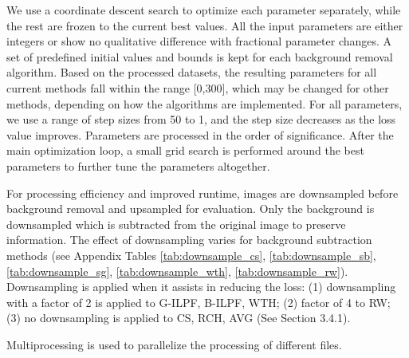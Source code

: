 \documentclass[iucr,review]{iucrjournals}
\begin{document}

We use a coordinate descent search to optimize each parameter separately, while the rest are frozen to the current best values. 
All the input parameters are either integers or show no qualitative difference with fractional parameter changes. 
A set of predefined initial values and bounds is kept for each background removal algorithm.
Based on the processed datasets, the resulting parameters for all current methods fall within the range [0,300],
which may be changed for other methods, depending on how the algorithms are implemented.
For all parameters, we use a range of step sizes from 50 to 1, and the step size decreases as the loss value improves. 
Parameters are processed in the order of significance. After the main optimization loop,
a small grid search is performed around the best parameters to further tune the parameters altogether.

For processing efficiency and improved runtime, images are downsampled before background removal
and upsampled for evaluation. Only the background is downsampled which is subtracted from the original image
to preserve information. The effect of downsampling varies for background subtraction methods
(see Appendix Tables \ref{tab:downsample_cs}, \ref{tab:downsample_sb}, \ref{tab:downsample_sg}, \ref{tab:downsample_wth}, \ref{tab:downsample_rw}).
Downsampling is applied when it assists in reducing the loss: (1)
downsampling with
a factor of 2 is applied to G-ILPF, B-ILPF, WTH; (2)
factor of 4 to RW; (3) no downsampling is applied to CS, RCH, AVG (See Section 3.4.1).

Multiprocessing is used to parallelize the processing of different files. 

\end{document}
